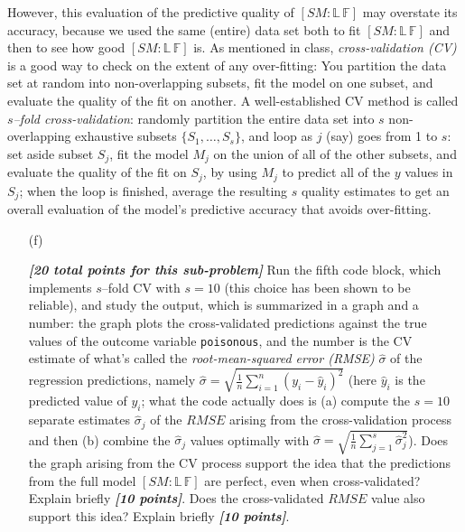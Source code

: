 \documentclass[12pt]{article}
\newcommand{\bi}[1]{\textbf{\textit{#1}}}
\begin{document}
However, this evaluation of the predictive quality of $[ SM \! \! : \! \mathbb{ L } \, \mathbb{ F } ]$ may overstate its accuracy, because we used the same (entire) data set both to fit $[ SM \! \! : \! \mathbb{ L } \, \mathbb{ F } ]$ and then to see how good $[ SM \! \! : \! \mathbb{ L } \, \mathbb{ F } ]$ is. As mentioned in class, \textit{cross-validation (CV)} is a good way to check on the extent of any over-fitting: You partition the data set at random into non-overlapping subsets, fit the model on one subset, and evaluate the quality of the fit on another. A well-established CV method is called \textit{$s$--fold cross-validation}: randomly partition the entire data set into $s$ non-overlapping exhaustive subsets $\{ S_1, \dots, S_s \}$, and loop as $j$ (say) goes from 1 to $s$: set aside subset $S_j$, fit the model $M_j$ on the union of all of the other subsets, and evaluate the quality of the fit on $S_j$, by using $M_j$ to predict all of the $y$ values in $S_j$; when the loop is finished, average the resulting $s$ quality estimates to get an overall evaluation of the model's predictive accuracy that avoids over-fitting.

\begin{itemize}

\item[(f)]

\bi{[20 total points for this sub-problem]} Run the fifth code block, which implements $s$--fold CV with $s = 10$ (this choice has been shown to be reliable), and study the output, which is summarized in a graph and a number: the graph plots the cross-validated predictions against the true values of the outcome variable \texttt{poisonous}, and the number is the CV estimate of what's called the \textit{root-mean-squared error (RMSE)} $\hat{ \sigma }$ of the regression predictions, namely $\hat{ \sigma } = \sqrt{ \frac{ 1 }{ n } \sum_{ i = 1 }^n ( y_i - \hat{ y }_i )^2 }$ (here $\hat{ y }_i$ is the predicted value of $y_i$; what the code actually does is (a) compute the $s = 10$ separate estimates $\hat{ \sigma }_j$ of the $RMSE$ arising from the cross-validation process and then (b) combine the $\hat{ \sigma }_j$ values optimally with $\hat{ \sigma } = \sqrt{ \frac{ 1 }{ n } \sum_{ j = 1 }^s \hat{ \sigma }_j^2 }$). Does the graph arising from the CV process support the idea that the predictions from the full model $[ SM \! \! : \! \mathbb{ L } \, \mathbb{ F } ]$ are perfect, even when cross-validated? Explain briefly \bi{[10 points]}. Does the cross-validated $RMSE$ value also support this idea? Explain briefly \bi{[10 points]}. 

\end{itemize}
\end{document}
